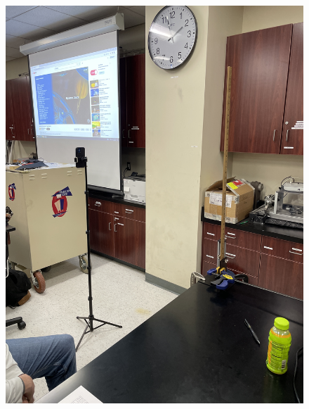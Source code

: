 \documentclass[letter paper, title page]{article}
\begin{document}
\begin{figure}[H]
    \centering
    \includegraphics[scale=0.2, angle=-90]{images/IMG_8653.JPG}

\end{figure}
\end{document}
